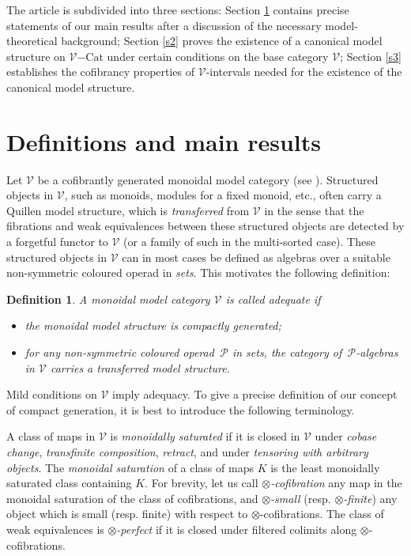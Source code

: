 \documentclass[10pt]{amsart}
\theoremstyle{plain}
\newtheorem{dfn}[subsection]{Definition}
\theoremstyle{remark}
\def\Vv{\mathcal{V}}
\def\Cat{\mathrm{Cat}}
\def\VCat{\Vv\mathrm{-}\Cat}
\def\Pp{\mathcal{P}}
\begin{document}
The article is subdivided into three sections: Section \ref{s1} contains precise statements of our main results after a discussion of the necessary model-theoretical background; Section \ref{s2} proves the existence of a canonical model structure on $\VCat$ under certain conditions on the base category $\Vv$; Section \ref{s3} establishes the cofibrancy properties of $\Vv$-intervals needed for the existence of the canonical model structure.


\section{Definitions and main results}\label{s1}Let $\Vv$ be a cofibrantly generated monoidal model category (see \cite{Hi,Ho}). Structured objects in $\Vv$, such as monoids, modules for a fixed monoid, etc., often carry a Quillen model structure, which is \emph{transferred} from $\Vv$ in the sense that the fibrations and weak equivalences between these structured objects are detected by a forgetful functor to $\Vv$ (or a family of such in the multi-sorted case). These structured objects in $\Vv$ can in most cases be defined as algebras over a suitable non-symmetric coloured operad in \emph{sets}. This motivates the following definition:

\begin{dfn}\label{adequate}A monoidal model category $\Vv$ is called \emph{adequate} if\begin{itemize}\item the monoidal model structure is compactly generated;\item for any non-symmetric coloured operad $\,\Pp$ in sets, the category of $\,\Pp$-algebras in $\Vv$ carries a transferred model structure.\end{itemize}\end{dfn}

\noindent Mild conditions on $\Vv$ imply adequacy. To give a precise definition of our concept of compact generation, it is best to introduce the following terminology.

A class of maps in $\Vv$ is \emph{monoidally saturated} if it is closed in $\Vv$ under \emph{cobase change}, \emph{transfinite composition}, \emph{retract}, and under \emph{tensoring with arbitrary objects}. The \emph{monoidal saturation} of a class of maps $K$ is the least monoidally saturated class containing $K$. For brevity, let us call \emph{$\otimes$-cofibration} any map in the monoidal saturation of the class of cofibrations, and \emph{$\otimes$-small} (resp. \emph{$\otimes$-finite}) any object which is small (resp. finite) with respect to $\otimes$-cofibrations. The class of weak equivalences is \emph{$\otimes$-perfect} if it is closed under filtered colimits along $\otimes$-cofibrations.
\end{document}
